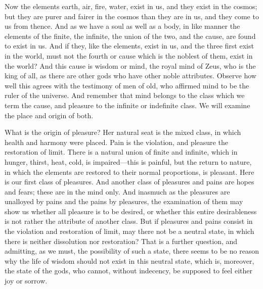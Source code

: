 \documentclass[11pt,letter]{article}
\begin{document}
\par  Now the elements earth, air, fire, water, exist in us, and they exist in the cosmos; but they are purer and fairer in the cosmos than they are in us, and they come to us from thence. And as we have a soul as well as a body, in like manner the elements of the finite, the infinite, the union of the two, and the cause, are found to exist in us. And if they, like the elements, exist in us, and the three first exist in the world, must not the fourth or cause which is the noblest of them, exist in the world? And this cause is wisdom or mind, the royal mind of Zeus, who is the king of all, as there are other gods who have other noble attributes. Observe how well this agrees with the testimony of men of old, who affirmed mind to be the ruler of the universe. And remember that mind belongs to the class which we term the cause, and pleasure to the infinite or indefinite class. We will examine the place and origin of both.

\par  What is the origin of pleasure? Her natural seat is the mixed class, in which health and harmony were placed. Pain is the violation, and pleasure the restoration of limit. There is a natural union of finite and infinite, which in hunger, thirst, heat, cold, is impaired—this is painful, but the return to nature, in which the elements are restored to their normal proportions, is pleasant. Here is our first class of pleasures. And another class of pleasures and pains are hopes and fears; these are in the mind only. And inasmuch as the pleasures are unalloyed by pains and the pains by pleasures, the examination of them may show us whether all pleasure is to be desired, or whether this entire desirableness is not rather the attribute of another class. But if pleasures and pains consist in the violation and restoration of limit, may there not be a neutral state, in which there is neither dissolution nor restoration? That is a further question, and admitting, as we must, the possibility of such a state, there seems to be no reason why the life of wisdom should not exist in this neutral state, which is, moreover, the state of the gods, who cannot, without indecency, be supposed to feel either joy or sorrow.
\end{document}
